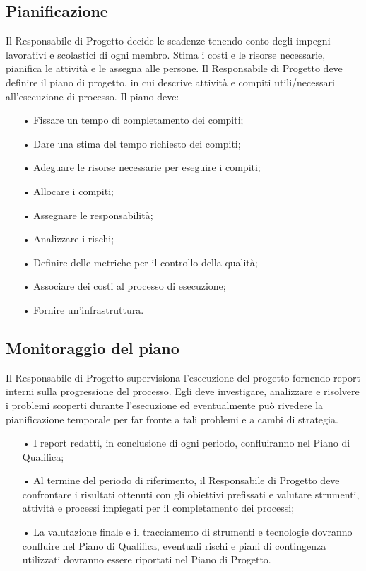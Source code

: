\subsection{Pianificazione}
Il Responsabile di Progetto decide le scadenze tenendo conto degli impegni lavorativi e scolastici di ogni membro. Stima i costi e le risorse necessarie, pianifica le attività e le assegna alle persone. 
\newline
Il Responsabile di Progetto deve definire il piano di progetto, in cui descrive attività e compiti utili/necessari all'esecuzione di processo.  
\newline
Il piano deve:
\begin{itemize}
\item[•] Fissare un tempo di completamento dei compiti;
\item[•] Dare una stima del tempo richiesto dei compiti;
\item[•] Adeguare le risorse necessarie per eseguire i compiti;
\item[•] Allocare i compiti;
\item[•] Assegnare le responsabilità; 
\item[•] Analizzare i rischi;
\item[•] Definire delle metriche per il controllo della qualità;
\item[•] Associare dei costi al processo di esecuzione;
\item[•] Fornire un'infrastruttura.
\end{itemize}

\subsection{Monitoraggio del piano}
Il Responsabile di Progetto supervisiona l'esecuzione del progetto fornendo report interni sulla progressione del processo. 
\newline
Egli deve investigare, analizzare e risolvere i problemi scoperti durante l'esecuzione ed eventualmente può rivedere la pianificazione temporale per far fronte a tali problemi e a cambi di strategia.
\begin{itemize}
\item[•] I report redatti, in conclusione di ogni periodo, confluiranno nel Piano di Qualifica;
\item[•] Al termine del periodo di riferimento, il Responsabile di Progetto deve confrontare i risultati ottenuti con gli obiettivi prefissati e valutare strumenti, attività e processi impiegati per il completamento dei processi;
\item[•] La valutazione finale e il tracciamento di strumenti e tecnologie dovranno confluire nel Piano di Qualifica, eventuali rischi e piani di contingenza utilizzati dovranno essere riportati nel Piano di Progetto.
\end{itemize}

